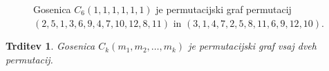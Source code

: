 \documentclass[a4paper, 12pt]{book}
\newtheorem{trditev}{Trditev}[chapter]
\begin{document}
\begin{figure}[h]
\begin{center}
    \end{center}
    \caption{ Gosenica $C_6(1, 1, 1, 1, 1, 1)$ je permutacijski graf permutacij $(2, 5, 1, 3, 6, 9, 4, 7, 10, 12, 8, 11)$ in $(3, 1, 4, 7, 2, 5, 8, 11, 6, 9, 12, 10)$.}
    \label{gosenica_dve_permutaciji2}
\end{figure}

\begin{trditev}
\label{trditev_gosenica_vsaj_dve_permutaciji}
    Gosenica $C_k(m_1, m_2, \dots, m_k)$ je permutacijski graf vsaj dveh permutacij.
\end{trditev}
\end{document}
